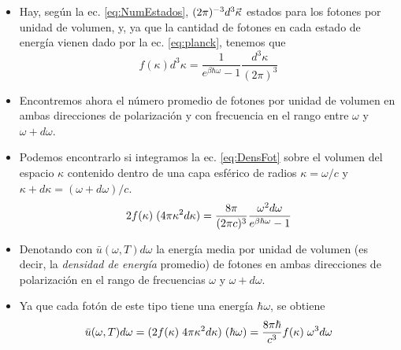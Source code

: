 \documentclass{sintefbeamer}
\begin{document}
\begin{frame}
    \begin{itemize}
        \item Hay, según la ec. \ref{eq:NumEstados}, $(2\pi)^{-3}d^3\Vec{\kappa}$ estados para los fotones por unidad de volumen, y, ya que la cantidad de fotones en cada estado de energía vienen dado por la ec. \ref{eq:planck}, tenemos que
        \begin{equation}
            f(\kappa)d^3\kappa = \frac{1}{e^{\beta \hbar \omega}-1} \frac{d^3\kappa}{(2\pi)^3}
            \label{eq:DensFot}
        \end{equation}\pause
        \item Encontremos ahora el número promedio de fotones por unidad de volumen en ambas direcciones de polarización y con frecuencia en el rango entre $\omega$ y $\omega+d\omega$.\pause
        \item Podemos encontrarlo si integramos la ec. \ref{eq:DensFot} sobre el volumen del espacio $\kappa$ contenido dentro de una capa esférico de radios $\kappa = \omega/c$ y $\kappa+d\kappa = (\omega+d\omega)/c$. %
        \begin{equation}
            2 f(\kappa)\hspace{1mm}(4\pi\kappa^2d\kappa) = \dfrac{8\pi}{(2\pi c)^3}\dfrac{\omega^2d\omega}{e^{\beta\hbar\omega}-1}
        \end{equation}
    \end{itemize}
\end{frame}

\begin{frame}
    \begin{itemize}
        \item Denotando con $\bar{u}(\omega,T)d\omega$ la energía media por unidad de volumen (es decir, la \emph{densidad de energía} promedio) de fotones en ambas direcciones de polarización en el rango de frecuencias $\omega$ y $\omega+d\omega$.\pause
        \item Ya que cada fotón de este tipo tiene una energía $\hbar\omega$, se obtiene
        \begin{equation}
            \bar{u}(\omega,T)d\omega = (2 f(\kappa)\hspace{1mm}4\pi\kappa^2d\kappa)\hspace{1mm}(\hbar\omega) = \dfrac{8\pi\hbar}{c^3}f(\kappa)\hspace{1mm}\omega^3d\omega
            \label{eq:DensEnerProm}
        \end{equation}
    \end{itemize}
\end{frame}
\end{document}
